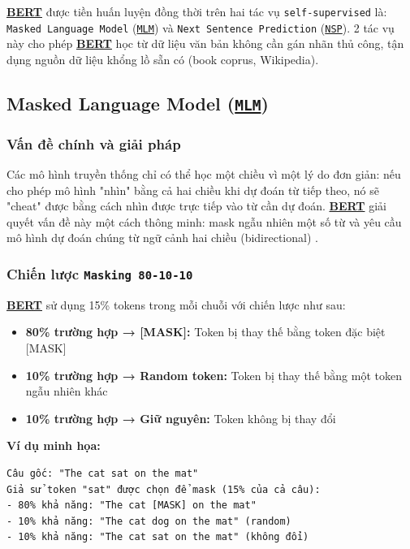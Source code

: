 \hyperref[acro:bert]{\textbf{BERT}} được tiền huấn luyện đồng thời trên hai tác vụ \texttt{self-supervised} là: \texttt{Masked Language Model} (\hyperref[acro:mlm]{\texttt{MLM}}) và \texttt{Next Sentence Prediction} (\hyperref[acro:nsp]{\texttt{NSP}}). 2 tác vụ này cho phép \hyperref[acro:bert]{\textbf{BERT}} học từ dữ liệu văn bản không cần gán nhãn thủ công, tận dụng nguồn dữ liệu khổng lồ sẵn có (book coprus, Wikipedia).

\subsection{Masked Language Model (\hyperref[acro:mlm]{\texttt{MLM}})}
\label{ssec:mlm}

\subsubsection{Vấn đề chính và giải pháp}
Các mô hình truyền thống chỉ có thể học một chiều vì một lý do đơn giản: nếu cho phép mô hình "nhìn" bằng cả hai chiều khi dự đoán từ tiếp theo, nó sẽ "cheat" được bằng cách nhìn được trực tiếp vào từ cần dự đoán. \hyperref[acro:bert]{\textbf{BERT}} giải quyết vấn đề này một cách thông minh: mask ngẫu nhiên một số từ và yêu cầu mô hình dự đoán chúng từ ngữ cảnh hai chiều (bidirectional) \cite{devlin2018bert}.

\subsubsection{Chiến lược \texttt{Masking 80-10-10}}
\hyperref[acro:bert]{\textbf{BERT}} sử dụng 15\% tokens trong mỗi chuỗi với chiến lược như sau:

\begin{itemize}
    \item \textbf{80\% trường hợp → [MASK]:} Token bị thay thế bằng token đặc biệt [MASK]
    \item \textbf{10\% trường hợp → Random token:} Token bị thay thế bằng một token ngẫu nhiên khác
    \item \textbf{10\% trường hợp → Giữ nguyên:} Token không bị thay đổi
\end{itemize}

\textbf{Ví dụ minh họa:}
\begin{verbatim}
Câu gốc: "The cat sat on the mat"
Giả sử token "sat" được chọn để mask (15% của cả câu):
- 80% khả năng: "The cat [MASK] on the mat"
- 10% khả năng: "The cat dog on the mat" (random)
- 10% khả năng: "The cat sat on the mat" (không đổi)
\end{verbatim}

